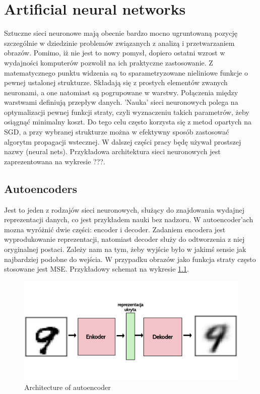 \chapter{Artificial neural networks}

Sztuczne sieci neuronowe mają obecnie bardzo mocno ugruntowaną pozycję szczególnie w dziedzinie problemów związanych z analizą i przetwarzaniem obrazów. Pomimo, iż nie jest to nowy pomysł, dopiero ostatni wzrost w wydajności komputerów pozwolił na ich praktyczne zastosowanie. Z matematycznego punktu widzenia są to sparametryzowane nieliniowe funkcje o pewnej ustalonej strukturze. Składają się z prostych elementów zwanych neuronami, a one natomiast są pogrupowane w warstwy. Połączenia między warstwami definiują przepływ danych. 'Nauka' sieci neuronowych polega na optymalizacji pewnej funkcji straty, czyli wyznaczeniu takich parametrów, żeby osiągnąć minimalny koszt. Do tego celu często korzysta się z metod opartych na SGD, a przy wybranej strukturze można w efektywny sposób zastosować algorytm propagacji wstecznej. W dalszej części pracy będę używał prostszej nazwy (neural nets). Przykładowa architektura sieci neuronowych jest zaprezentowana na wykresie ???.

\section{Autoencoders}

Jest to jeden z rodzajów sieci neuronowych, służący do znajdowania wydajnej reprezentacji danych, co jest przykładem nauki bez nadzoru. W autoencoder'ach mozna wyróżnić dwie części: encoder i decoder. Zadaniem encodera jest wyprodukowanie reprezentacji, natomiast decoder służy do odtworzenia z niej oryginalnej postaci. Zależy nam na tym, żeby wyjście było w jakimś sensie jak najbardziej podobne do wejścia. W przypadku obrazów jako funkcja straty często stosowane jest MSE. Przykładowy schemat na wykresie \ref{fig:autoenc}.

\begin{figure}
    \centering
    \includegraphics[width=1\textwidth]{images/autoenc}
    \caption{Architecture of autoencoder}
    \label{fig:autoenc}
\end{figure}

